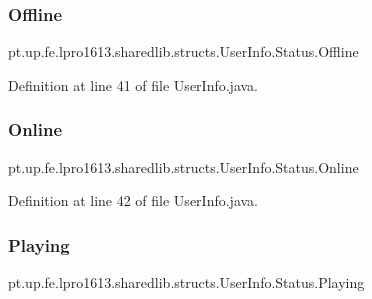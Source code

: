\subsubsection{\texorpdfstring{Offline}{Offline}}
{\footnotesize\ttfamily pt.\+up.\+fe.\+lpro1613.\+sharedlib.\+structs.\+User\+Info.\+Status.\+Offline}



Definition at line 41 of file User\+Info.\+java.

\hypertarget{enumpt_1_1up_1_1fe_1_1lpro1613_1_1sharedlib_1_1structs_1_1_user_info_1_1_status_a370401fb9fd867386c9db75f904411a8}{}\label{enumpt_1_1up_1_1fe_1_1lpro1613_1_1sharedlib_1_1structs_1_1_user_info_1_1_status_a370401fb9fd867386c9db75f904411a8} 
\subsubsection{\texorpdfstring{Online}{Online}}
{\footnotesize\ttfamily pt.\+up.\+fe.\+lpro1613.\+sharedlib.\+structs.\+User\+Info.\+Status.\+Online}



Definition at line 42 of file User\+Info.\+java.

\hypertarget{enumpt_1_1up_1_1fe_1_1lpro1613_1_1sharedlib_1_1structs_1_1_user_info_1_1_status_a41608b6e9d7a9df06710d1547ee51531}{}\label{enumpt_1_1up_1_1fe_1_1lpro1613_1_1sharedlib_1_1structs_1_1_user_info_1_1_status_a41608b6e9d7a9df06710d1547ee51531} 
\subsubsection{\texorpdfstring{Playing}{Playing}}
{\footnotesize\ttfamily pt.\+up.\+fe.\+lpro1613.\+sharedlib.\+structs.\+User\+Info.\+Status.\+Playing}



